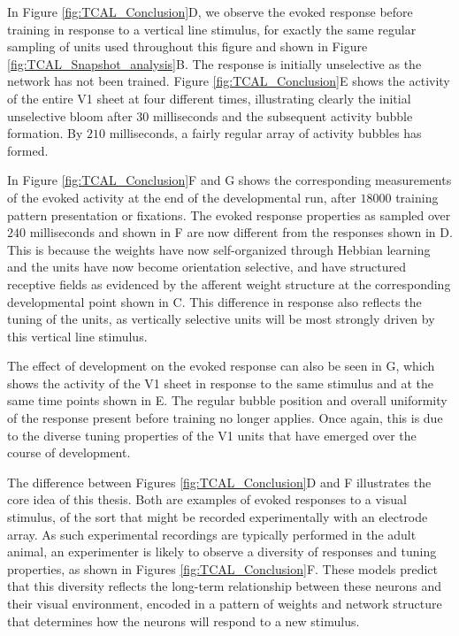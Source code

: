 \documentclass[phd,ianc,twoside]{infthesis}
\begin{document}
In Figure \ref{fig:TCAL_Conclusion}D, we observe the evoked response
before training in response to a vertical line stimulus, for exactly the
same regular sampling of units used throughout this figure and shown in
Figure \ref{fig:TCAL_Snapshot_analysis}B. The response is initially unselective as
the network has not been trained. Figure \ref{fig:TCAL_Conclusion}E
shows the activity of the entire V1 sheet at four different times,
illustrating clearly the initial unselective bloom after $30$
milliseconds and the subsequent activity bubble formation. By $210$
milliseconds, a fairly regular array of activity bubbles has formed.

In Figure \ref{fig:TCAL_Conclusion}F and G shows the corresponding
measurements of the evoked activity at the end of the developmental run,
after $18000$ training pattern presentation or fixations. The evoked
response properties as sampled over $240$ milliseconds and shown in F
are now different from the responses shown in D. This is because the
weights have now self-organized through Hebbian learning and the units
have now become orientation selective, and have structured receptive
fields as evidenced by the afferent weight structure at the
corresponding developmental point shown in C. This difference in
response also reflects the tuning of the units, as vertically selective
units will be most strongly driven by this vertical line stimulus.

The effect of development on the evoked response can also be seen in G,
which shows the activity of the V1 sheet in response to the same
stimulus and at the same time points shown in E. The regular bubble
position and overall uniformity of the response present before
training no longer applies. Once again, this is due to the diverse
tuning properties of the V1 units that have emerged over the course
of development.

The difference between Figures \ref{fig:TCAL_Conclusion}D and F
illustrates the core idea of this thesis. Both are examples of evoked
responses to a visual stimulus, of the sort that might be recorded
experimentally with an electrode array. As such experimental recordings
are typically performed in the adult animal, an experimenter is
likely to observe a diversity of responses and tuning properties, as
shown in Figures \ref{fig:TCAL_Conclusion}F.  These models predict
that this diversity reflects the long-term relationship between these
neurons and their visual environment, encoded in a pattern of weights
and network structure that determines how the neurons will respond to
a new stimulus.
\end{document}
